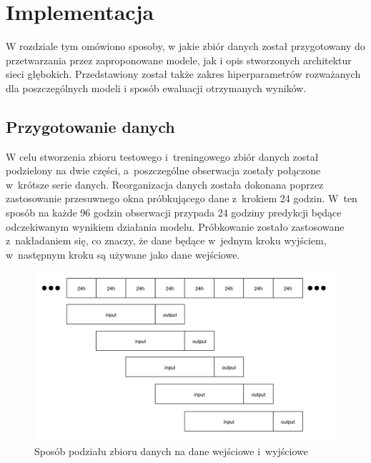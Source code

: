 \section{Implementacja}

W rozdziale tym omówiono sposoby, w jakie zbiór danych został przygotowany 
do przetwarzania przez zaproponowane modele, jak i opis stworzonych architektur sieci głębokich. Przedstawiony został także zakres hiperparametrów rozważanych dla poszczególnych modeli i sposób ewaluacji otrzymanych wyników.

\subsection{Przygotowanie danych}

W celu stworzenia zbioru testowego i~treningowego zbiór danych został podzielony
na dwie części, a~poszczególne obserwacja zostały połączone w~krótsze serie danych.
Reorganizacja danych została dokonana poprzez zastosowanie przesuwnego okna próbkującego
dane z~krokiem 24 godzin. W~ten sposób na każde 96 godzin obserwacji przypada 24 godziny predykcji
będące odczekiwanym wynikiem działania modelu. Próbkowanie zostało zastosowane z~nakładaniem się,
co znaczy, że dane będące w~jednym kroku wyjściem, w~następnym kroku są używane jako dane wejściowe.

\begin{figure}[H]
    \centering
    \includegraphics[width=\textwidth]{images/division.png}
    \caption[Podział zbioru danych]{Sposób podziału zbioru danych na dane wejściowe i~wyjściowe}
    \label{division}
\end{figure}


